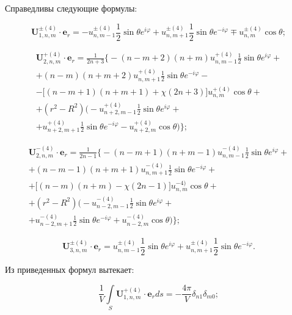 \begin{russian}
Справедливы следующие формулы:

\begin{equation}
\mathbf{U}_{1,n,m}^{\pm(4)}\cdot\mathbf{e}_r=-u_{n,m-1}^{\pm(4)}\frac{1}{2}\sin\theta e^{i\varphi}+u_{n,m+1}^{\pm(4)}\frac{1}{2}\sin\theta e^{-i\varphi}\mp u_{n,m}^{\pm(4)}\cos\theta;
\label{eq:12:11}
\end{equation}

\begin{multline}
\mathbf{U}_{2,n,m}^{+(4)}\cdot\mathbf{e}_r=\frac{1}{2n+3}\bigg\{-(n-m+2)(n+m)u_{n,m-1}^{+(4)}\frac{1}{2}\sin\theta e^{i\varphi}+ \\
+(n-m)(n+m+2)u_{n,m+1}^{+(4)}\frac{1}{2}\sin\theta e^{-i\varphi}- \\
-\bigg\lbrack(n-m+1)(n+m+1)+\chi(2n+3)\bigg\rbrack u_{n,m}^{+(4)}\cos\theta+ \\
+(r^2-R^2)\bigg(-u_{n+2,m-1}^{+(4)}\frac{1}{2}\sin\theta e^{i\varphi}+ \\
+u_{n+2,m+1}^{+(4)}\frac{1}{2}\sin\theta e^{-i\varphi}-u_{n+2,m}^{+(4)}\cos\theta\bigg)\bigg\};
\label{eq:12:12}
\end{multline}

\begin{multline}
\mathbf{U}_{2,n,m}^{-(4)}\cdot\mathbf{e}_r=\frac{1}{2n-1}\bigg\{-(n-m+1)(n+m-1)u_{n,m-1}^{-(4)}\frac{1}{2}\sin\theta e^{i\varphi}+ \\
+(n-m-1)(n+m+1)u_{n,m+1}^{-(4)}\frac{1}{2}\sin\theta e^{-i\varphi}+ \\
+\bigg\lbrack(n-m)(n+m)-\chi(2n-1)\bigg\rbrack u_{n,m}^{-4)}\cos\theta+ \\
+(r^2-R^2)\bigg(-u_{n-2,m-1}^{-(4)}\frac{1}{2}\sin\theta e^{i\varphi}+ \\
+u_{n-2,m+1}^{-(4)}\frac{1}{2}\sin\theta e^{-i\varphi}+u_{n-2,m}^{-(4)}\cos\theta\bigg)\bigg\};
\label{eq:12:13}
\end{multline}

\begin{equation}
\mathbf{U}_{3,n,m}^{\pm(4)}\cdot\mathbf{e}_r=u_{n,m-1}^{\pm(4)}\frac{1}{2}\sin\theta e^{i\varphi}+u_{n,m+1}^{\pm(4)}\frac{1}{2}\sin\theta e^{-i\varphi}.
\label{eq:12:14}
\end{equation}

Из приведенных формул вытекает:

\begin{equation}
\frac{1}{V}\int\limits_S \mathbf{U}_{1,n,m}^{+(4)}\cdot\mathbf{e}_r ds=-\frac{4\pi}{V}\delta_{n1}\delta_{m0};
\label{eq:12:15}
\end{equation}


\end{russian}

